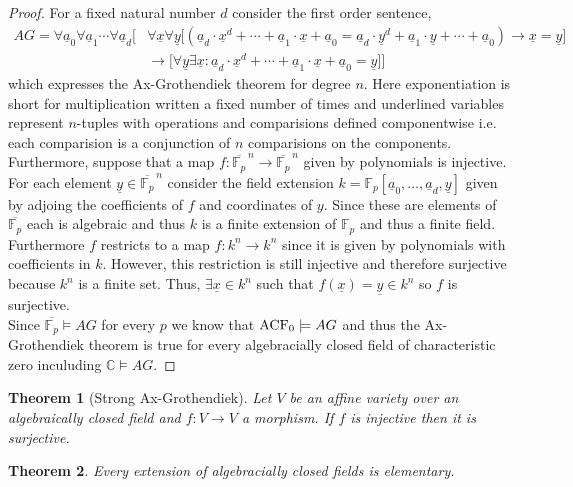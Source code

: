 \documentclass[12pt]{article}
\newcommand{\C}{\mathbb{C}}
\newcommand{\finfield}[1]{\mathbb{F}_{#1}}
\newcommand{\entails}{\models}
\newcommand{\ul}[1]{\underline{#1}}
\theoremstyle{theorem}
\newtheorem{theorem}{Theorem}[section]
\theoremstyle{definition}
\theoremstyle{definition}
\theoremstyle{remark}
\theoremstyle{definition}
\theoremstyle{remark}
\begin{document}
\begin{proof}
For a fixed natural number $d$ consider the first order sentence,
\begin{align*}
AG = \forall \ul{a}_0 \forall \ul{a}_1 \cdots \forall \ul{a}_d \bigg[ &  \forall \ul{x} \forall \ul{y} \Big[ \left( \ul{a}_d \cdot \ul{x}^d + \cdots + \ul{a}_1 \cdot \ul{x} + \ul{a}_0 = \ul{a}_d \cdot \ul{y}^d + \ul{a}_1 \cdot \ul{y} + \cdots + \ul{a}_0 \right) \to \ul{x} = \ul{y} \Big]
\\
&\to \Big[ \forall \ul{y} \exists \ul{x} : \ul{a}_d \cdot \ul{x}^d + \cdots + \ul{a}_1 \cdot \ul{x} + \ul{a}_0 = \ul{y}  \Big] \bigg]
\end{align*}
which expresses the Ax-Grothendiek theorem for degree $n$. Here exponentiation is short for multiplication written a fixed number of times and underlined variables represent $n$-tuples with operations and comparisions defined componentwise i.e. each comparision is a conjunction of $n$ comparisions on the components. Furthermore, suppose that a map $f : \overline{\finfield{p}}^{\,n} \to \overline{\finfield{p}}^{\,n}$ given by polynomials is injective. For each element $\ul{y} \in \overline{\finfield{p}}^{\,n}$ consider the field extension $k = \finfield{p}[\ul{a}_0, \dots, \ul{a}_d, \ul{y}]$ given by adjoing the coefficients of $f$ and coordinates of $y$. Since these are elements of $\overline{\finfield{p}}$ each is algebraic and thus $k$ is a finite extension of $\finfield{p}$ and thus a finite field. Furthermore $f$ restricts to a map $f : k^n \to k^n$ since it is given by polynomials with coefficients in $k$. However, this restriction is still injective and therefore surjective because $k^n$ is a finite set. Thus, $\exists \ul{x} \in k^n$ such that $f(\ul{x}) = \ul{y} \in k^n$ so $f$ is surjective. 
\bigskip\\
Since $\overline{\finfield{p}} \entails AG$ for every $p$ we know that $\ACF{0} \entails AG$ and thus the Ax-Grothendiek theorem is true for every algebracially closed field of characteristic zero inculuding $\C \entails AG$. 
\end{proof}

\begin{theorem}[Strong Ax-Grothendiek]
Let $V$ be an affine variety over an algebraically closed field and $f : V \to V$ a morphism. If $f$ is injective then it is surjective. 
\end{theorem}

\begin{theorem}
Every extension of algebracially closed fields is elementary.
\end{theorem}
\end{document}
